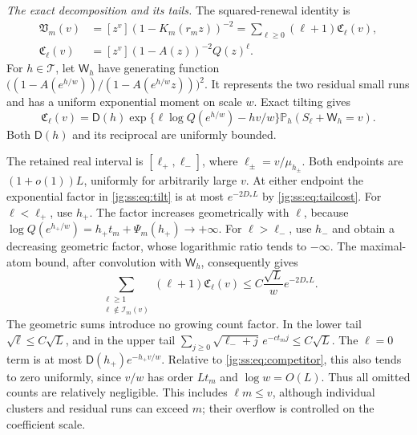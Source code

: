 \documentclass[11pt,a4paper]{article}
\theoremstyle{definition}\newaliascnt{definition}{theorem}
\theoremstyle{remark}\newaliascnt{remark}{theorem}
\newcommand{\ljP}{\mathbb P}
\begin{document}
\emph{The exact decomposition and its tails.} The squared-renewal identity is
\begin{equation}\label{jg:ss:eq:decomp}
 \begin{split}
 \mathfrak V_m(v)&=[z^v](1-K_m(r_mz))^{-2}
       =\sum_{\ell\ge0}(\ell+1)\mathfrak C_\ell(v),\\
 \mathfrak C_\ell(v)&=[z^v](1-A(z))^{-2}Q(z)^\ell.
 \end{split}
\end{equation}
For $h\in\mathcal T$, let $\mathsf W_h$ have generating function
$\bigl((1-A(e^{h/w}))/(1-A(e^{h/w}z))\bigr)^2$. It represents the two residual
small runs and has a uniform exponential moment on scale $w$. Exact tilting
gives
\begin{equation}\label{jg:ss:eq:tilt}
 \mathfrak C_\ell(v)=\mathsf D(h)
  \exp\{\ell\log Q(e^{h/w})-hv/w\}
  \ljP_h(S_\ell+\mathsf W_h=v).
\end{equation}
Both $\mathsf D(h)$ and its reciprocal are uniformly bounded.

The retained real interval is $[\ell_+,\ell_-]$, where $\ell_\pm=v/\mu_{h_\pm}$.
Both endpoints are $(1+o(1))L$, uniformly for arbitrarily large $v$. At either
endpoint the exponential factor in \eqref{jg:ss:eq:tilt} is at most
$e^{-2D_*L}$ by \eqref{jg:ss:eq:tailcost}. For $\ell<\ell_+$, use $h_+$. The
factor increases geometrically with $\ell$, because
$\log Q(e^{h_+/w})=h_+t_m+\Psi_m(h_+)\to+\infty$. For $\ell>\ell_-$, use $h_-$
and obtain a decreasing geometric factor, whose logarithmic ratio tends to
$-\infty$. The maximal-atom bound, after convolution with $\mathsf W_h$,
consequently gives
\begin{equation}\label{jg:ss:eq:tail}
 \sum_{\substack{\ell\ge1\\\ell\notin\mathcal I_m(v)}}
      (\ell+1)\mathfrak C_\ell(v)
 \le C\frac{\sqrt L}{w}e^{-2D_*L}.
\end{equation}
The geometric sums introduce no growing count factor. In the lower tail
$\sqrt\ell\le C\sqrt L$, and in the upper tail
$\sum_{j\ge0}\sqrt{\ell_-+j}\,e^{-ct_mj}\le C\sqrt L$. The $\ell=0$ term is at
most $\mathsf D(h_+)e^{-h_+v/w}$. Relative to \eqref{jg:ss:eq:competitor}, this
also tends to zero uniformly, since $v/w$ has order $Lt_m$ and $\log w=O(L)$.
Thus all omitted counts are relatively negligible. This includes $\ell m\le v$,
although individual clusters and residual runs can exceed $m$; their overflow is
controlled on the coefficient scale.
\end{document}
